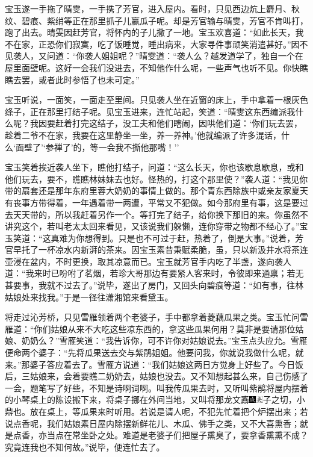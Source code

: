 宝玉遂一手拖了晴雯，一手携了芳官，进入屋内。看时，只见西边炕上麝月、秋纹、碧痕、紫绡等正在那里抓子儿赢瓜子呢。却是芳官输与晴雯，芳官不肯叫打，跑了出去。晴雯因赶芳官，将怀内的子儿撒了一地。宝玉欢喜道：``如此长天，我不在家，正恐你们寂寞，吃了饭睡觉，睡出病来，大家寻件事顽笑消遣甚好。''因不见袭人，又问道：``你袭人姐姐呢？''晴雯道：``袭人么？越发道学了，独自一个在屋里面壁呢。这好一会我们没进去，不知他作什么呢，一些声气也听不见。你快瞧瞧去罢，或者此时参悟了也未可定。''

宝玉听说，一面笑，一面走至里间。只见袭人坐在近窗的床上，手中拿着一根灰色绦子，正在那里打结子呢。见宝玉进来，连忙站起，笑道：``晴雯这东西编派我什么呢？我因要赶着打完这结子，没工夫和他们瞎闹，因哄他们道：`你们玩去罢，趁着二爷不在家，我要在这里静坐一坐，养一养神。'他就编派了许多混话，什么`面壁了'`参禅了'的，等一会我不撕他那嘴！''

宝玉笑着挨近袭人坐下，瞧他打结子，问道：``这么长天，你也该歇息歇息，或和他们玩去，要不，瞧瞧林妹妹去也好。怪热的，打这个那里使？''袭人道：``我见你带的扇套还是那年东府里蓉大奶奶的事情上做的。那个青东西除族中或亲友家夏天有丧事方带得着，一年遇着带一两遭，平常又不犯做。如今那府里有事，这是要过去天天带的，所以我赶着另作一个。等打完了结子，给你换下那旧的来。你虽然不讲究这个，若叫老太太回来看见，又该说我们躲懒，连你穿带之物都不经心了。''宝玉笑道：``这真难为你想得到。只是也不可过于赶，热着了，倒是大事。''说着，芳官早托了一杯凉水内新湃的茶来。因宝玉素昔秉赋柔脆，虽，只以新汲井水将茶连壶浸在盆内，不时更换，取其凉意而已。宝玉就芳官手内吃了半盏，遂向袭人道：``我来时已吩咐了茗烟，若珍大哥那边有要紧人客来时，令彼即来通禀；若无甚要事，我就不过去了。''说毕，遂出了房门，又回头向碧痕等道：``如有事，往林姑娘处来找我。''于是一径往潇湘馆来看黛玉。

将走过沁芳桥，只见雪雁领着两个老婆子，手中都拿着菱藕瓜果之类。宝玉忙问雪雁道：``你们姑娘从来不大吃这些凉东西的，拿这些瓜果何用？莫非是要请那位姑娘、奶奶么？''雪雁笑道：``我告诉你，可不许你对姑娘说去。''宝玉点头应允。雪雁便命两个婆子：``先将瓜果送去交与紫鹃姐姐。他要问我，你就说我做什么呢，就来。''那婆子答应着去了。雪雁方说道：``我们姑娘这两日方觉身上好些了。今日饭后，三姑娘来，会着要瞧二奶奶去，姑娘也没去。又不知想起甚么来，自己伤感了一会，题笔写了好些，不知是诗啊词啊。叫我传瓜果去时，又听叫紫鹃将屋内摆着的小琴桌上的陈设搬下来，将桌子挪在外间当地，又叫将那龙文鼒{\includegraphics[width=3mm]{../Images/00005}\includegraphics[width=3mm]{../Images/00012}\footnotesize \kaishu 子之切，小鼎也。}放在桌上，等瓜果来时听用。若说是请人呢，不犯先忙着把个炉摆出来；若说点香呢，我们姑娘素日屋内除摆新鲜花儿、木瓜、佛手之类，又不大喜熏香；就是点香，亦当点在常坐卧之处。难道是老婆子们把屋子熏臭了，要拿香熏熏不成？究竟连我也不知何故。''说毕，便连忙去了。

